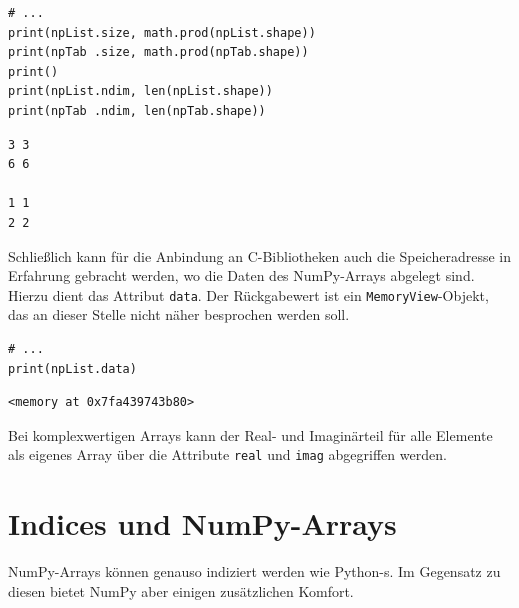 \begin{codebox}[Beispiel: Anzahl Elemente \& Dimensionen, width=.57\linewidth, nobeforeafter, equal height group = grpXmpSimpleNDimsElements]
\begin{verbatim}
# ...
print(npList.size, math.prod(npList.shape))
print(npTab .size, math.prod(npTab.shape))
print()
print(npList.ndim, len(npList.shape))
print(npTab .ndim, len(npTab.shape))
\end{verbatim}
\end{codebox}
%
\hspace{0.5cm}
\begin{cmdbox}[Anzahl Elemente \& Dimensionen, width=.4\linewidth, nobeforeafter, equal height group = grpXmpSimpleNDimsElements]
\begin{verbatim}
3 3
6 6

1 1
2 2
\end{verbatim}
\end{cmdbox}

Schließlich kann für die Anbindung an C-Bibliotheken auch die Speicheradresse in Erfahrung gebracht werden, wo die Daten des NumPy-Arrays abgelegt sind. Hierzu dient das Attribut \texttt{data}. Der Rückgabewert ist ein \texttt{MemoryView}-Objekt, das an dieser Stelle nicht näher besprochen werden soll.

\begin{codebox}[Beispiel: Adresse eines Arrays, width=.57\linewidth, nobeforeafter, equal height group = grpXmpNumPyMemory]
\begin{verbatim}
# ...
print(npList.data)
\end{verbatim}
\end{codebox}
%
\hspace{0.5cm}
\begin{cmdbox}[Ausgabe: Adresse eines Arrays, width=.4\linewidth, nobeforeafter, equal height group = grpXmpNumPyMemory]
\begin{verbatim}
<memory at 0x7fa439743b80>
\end{verbatim}
\end{cmdbox}

Bei komplexwertigen Arrays kann der Real- und Imaginärteil für alle Elemente als eigenes Array über die Attribute \texttt{real} und \texttt{imag} abgegriffen werden.

\section{Indices und NumPy-Arrays}
NumPy-Arrays können genauso indiziert werden wie Python-s. Im Gegensatz zu diesen bietet NumPy aber einigen zusätzlichen Komfort.

